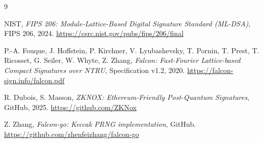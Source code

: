 \documentclass[11pt,a4paper]{article}
\begin{document}
\newpage
\begin{thebibliography}{9}

  NIST,
  \textit{FIPS 206: Module-Lattice-Based Digital Signature Standard (ML-DSA)},
  FIPS 206, 2024.
  \url{https://csrc.nist.gov/pubs/fips/206/final}

  P.-A. Fouque, J. Hoffstein, P. Kirchner, V. Lyubashevsky, T. Pornin,
  T. Prest, T. Ricosset, G. Seiler, W. Whyte, Z. Zhang,
  \textit{Falcon: Fast-Fourier Lattice-based Compact Signatures over NTRU},
  Specification v1.2, 2020.
  \url{https://falcon-sign.info/falcon.pdf}

  R. Dubois, S. Masson,
  \textit{ZKNOX: Ethereum-Friendly Post-Quantum Signatures},
  GitHub, 2025.
  \url{https://github.com/ZKNox}

  Z. Zhang,
  \textit{Falcon-go: Keccak PRNG implementation},
  GitHub.
  \url{https://github.com/zhenfeizhang/falcon-go}

\end{thebibliography}
\end{document}
